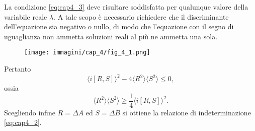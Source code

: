 La condizione \eqref{eq:cap4_3} deve risultare soddisfatta per qualunque valore della variabile reale $\lambda$. A tale scopo è necessario richiedere che il discriminante dell'equazione sia negativo o nullo, di modo che l'equazione con il segno di uguaglianza non ammetta soluzioni reali  al più ne ammetta una sola.

\begin{figure}[!htbp]
\begin{center}
\texttt{[image: immagini/cap\_4/fig\_4\_1.png]}
\end{center}
\end{figure}
\noindent Pertanto
\begin{equation}
\langle i \left[R,S \right] \rangle ^2 - 4\langle R^2 \rangle \langle S^2 \rangle \leq 0,
\end{equation}
ossia
\begin{equation}
\langle R^2 \rangle \langle S^2 \rangle \geq \frac{1}{4}\langle i \left[R,S \right] \rangle ^2.
\end{equation}
Scegliendo infine $R=\Delta A$ ed $S= \Delta B$ si ottiene la relazione di indeterminazione \eqref{eq:cap4_2}.
